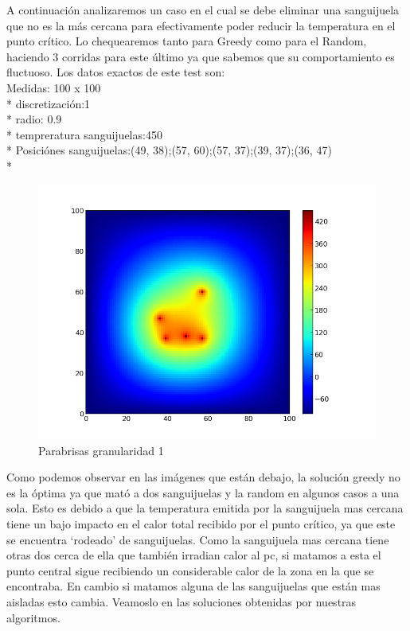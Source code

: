 A continuación analizaremos un caso en el cual se debe eliminar una sanguijuela que no es la más cercana para efectivamente poder reducir la temperatura en el punto crítico. Lo chequearemos tanto para Greedy como para el Random, haciendo 3 corridas para este último ya que sabemos que su comportamiento es fluctuoso.
Los datos exactos de este test son:\\
Medidas: 100 x 100 \\* 
discretización:1 \\* 
radio: 0.9 \\* 
tempreratura sanguijuelas:450 \\* 
Posiciónes sanguijuelas:(49, 38);(57, 60);(57, 37);(39, 37);(36, 47) \\* 
\begin{figure}[htb]
\begin{center}
\includegraphics[scale=0.40]{imagenes/test6.png} 
\caption{Parabrisas granularidad 1} 
\end{center}
\end{figure}

Como podemos observar en las imágenes que están debajo, la solución greedy no es la óptima ya que mató a dos sanguijuelas y la random en algunos casos a una sola. Esto es debido a que la temperatura emitida por la sanguijuela mas cercana tiene un bajo impacto en el calor total recibido por el punto crítico, ya que este se encuentra `rodeado' de sanguijuelas. Como la sanguijuela mas cercana tiene otras dos cerca de ella que también irradian calor al pc, si matamos a esta el punto central sigue recibiendo un considerable calor de la zona en la que se encontraba. En cambio si matamos alguna de las sanguijuelas que están mas aisladas esto cambia. Veamoslo en las soluciones obtenidas por nuestras algoritmos. 


